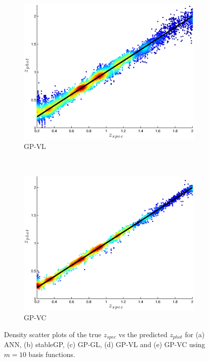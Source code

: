 \documentclass[useAMS,usenatbib,fleqn]{mn2e}
\begin{document}
\begin{figure}
        \begin{subfigure}[b]{0.3\textwidth}
               \includegraphics[width=\textwidth]{figures/GPVL.eps}
                \caption{GP-VL}
        \end{subfigure}
        ~
        \begin{subfigure}[b]{0.3\textwidth}
                \includegraphics[width=\textwidth]{figures/GPVC.eps}
                \caption{GP-VC}
        \end{subfigure}
        
        \caption{Density scatter plots of the true $z_{spec}$ vs the predicted $z_{phot}$ for (a) ANN, (b) stableGP, (c) GP-GL, (d) GP-VL and (e) GP-VC using $m=10$ basis functions.}
        \label{fig-experiment-1}
\end{figure}
\end{document}
